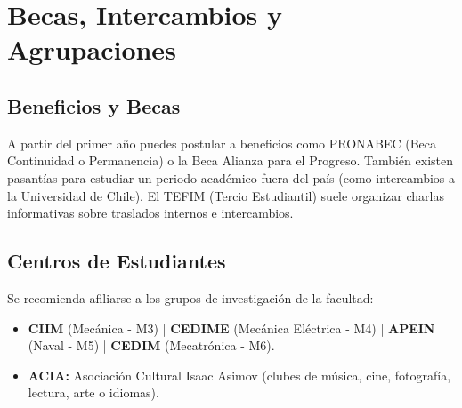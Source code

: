 \section{Becas, Intercambios y Agrupaciones}

\subsection{Beneficios y Becas}
A partir del primer año puedes postular a beneficios como PRONABEC (Beca Continuidad o Permanencia) o la Beca Alianza para el Progreso. También existen pasantías para estudiar un periodo académico fuera del país (como intercambios a la Universidad de Chile). El TEFIM (Tercio Estudiantil) suele organizar charlas informativas sobre traslados internos e intercambios.

\subsection{Centros de Estudiantes}
Se recomienda afiliarse a los grupos de investigación de la facultad:
\begin{itemize}
    \item \textbf{CIIM} (Mecánica - M3) | \textbf{CEDIME} (Mecánica Eléctrica - M4) | \textbf{APEIN} (Naval - M5) | \textbf{CEDIM} (Mecatrónica - M6).
    \item \textbf{ACIA:} Asociación Cultural Isaac Asimov (clubes de música, cine, fotografía, lectura, arte o idiomas).
\end{itemize}
